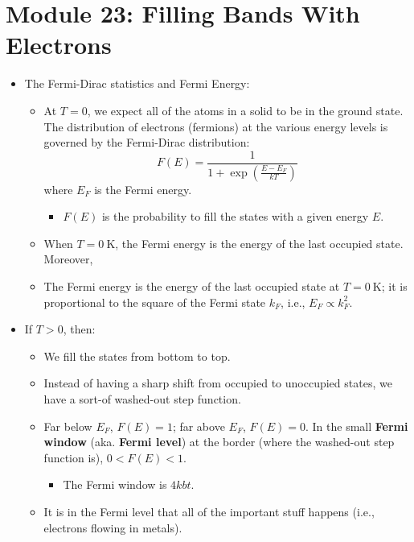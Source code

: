 \documentclass[../notes.tex]{subfiles}
\begin{document}
\section{Module 23: Filling Bands With Electrons}
\begin{itemize}
    \item The Fermi-Dirac statistics and Fermi Energy:
    \begin{itemize}
        \item At $T=0$, we expect all of the atoms in a solid to be in the ground state. The distribution of electrons (fermions) at the various energy levels is governed by the Fermi-Dirac distribution:
        \begin{equation*}
            F(E) = \frac{1}{1+\exp\left( \frac{E-E_F}{kT} \right)}
        \end{equation*}
        where $E_F$ is the Fermi energy.
        \begin{itemize}
            \item $F(E)$ is the probability to fill the states with a given energy $E$.
        \end{itemize}
        \item When $T=\SI{0}{\kelvin}$, the Fermi energy is the energy of the last occupied state. Moreover, 
        \item The Fermi energy is the energy of the last occupied state at $T=\SI{0}{\kelvin}$; it is proportional to the square of the Fermi state $k_F$, i.e., $E_F\propto k_F^2$.
    \end{itemize}
    \item If $T>0$, then:
    \begin{itemize}
        \item We fill the states from bottom to top.
        \item Instead of having a sharp shift from occupied to unoccupied states, we have a sort-of washed-out step function.
        \item Far below $E_F$, $F(E)=1$; far above $E_F$, $F(E)=0$. In the small \textbf{Fermi window} (aka. \textbf{Fermi level}) at the border (where the washed-out step function is), $0<F(E)<1$.
        \begin{itemize}
            \item The Fermi window is $4kbt$.
        \end{itemize}
        \item It is in the Fermi level that all of the important stuff happens (i.e., electrons flowing in metals).
    \end{itemize}

\end{itemize}
\end{document}
